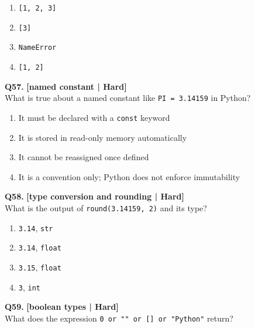 \begin{enumerate}[label=(\alph*),topsep=2pt,itemsep=1pt,partopsep=0pt,parsep=0pt]
    \item \relax \texttt{[1, 2, 3]}
    \item \relax \texttt{[3]}
    \item \relax \texttt{NameError}
    \item \relax \texttt{[1, 2]}
\end{enumerate}
\vspace{2mm}

\noindent\textbf{Q57.} \hfill {\small\color{LPUOrange}\textbf{[named constant | Hard]}}\\[2pt]
What is true about a named constant like \texttt{PI = 3.14159} in Python?

\begin{enumerate}[label=(\alph*),topsep=2pt,itemsep=1pt,partopsep=0pt,parsep=0pt]
    \item \relax It must be declared with a \texttt{const} keyword
    \item \relax It is stored in read-only memory automatically
    \item \relax It cannot be reassigned once defined
    \item \relax It is a convention only; Python does not enforce immutability
\end{enumerate}
\vspace{2mm}

\noindent\textbf{Q58.} \hfill {\small\color{LPUOrange}\textbf{[type conversion and rounding | Hard]}}\\[2pt]
What is the output of \texttt{round(3.14159, 2)} and its type?

\begin{enumerate}[label=(\alph*),topsep=2pt,itemsep=1pt,partopsep=0pt,parsep=0pt]
    \item \relax \texttt{3.14}, \texttt{str}
    \item \relax \texttt{3.14}, \texttt{float}
    \item \relax \texttt{3.15}, \texttt{float}
    \item \relax \texttt{3}, \texttt{int}
\end{enumerate}
\vspace{2mm}

\noindent\textbf{Q59.} \hfill {\small\color{LPUOrange}\textbf{[boolean types | Hard]}}\\[2pt]
What does the expression \texttt{0 or "" or [] or "Python"} return?

